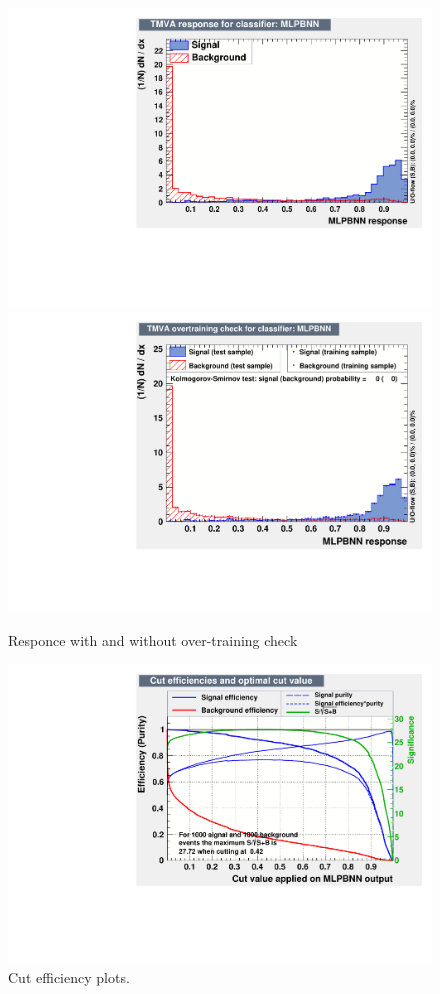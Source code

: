 \begin{figure}[h!]
\centering
\includegraphics[width=.49\textwidth]{figures/TMVA/responceTest.pdf}
\includegraphics[width=.49\textwidth]{figures/TMVA/responceTestOT.pdf}
\caption{Responce with and without over-training check}
\label{fig:TMVAresponce}
\end{figure}

\begin{figure}[h!]
\centering

\includegraphics[width=\textwidth]{figures/TMVA/Cuts.pdf}
\caption{Cut efficiency plots.}
\label{fig:TMVAcuts}
\end{figure}


